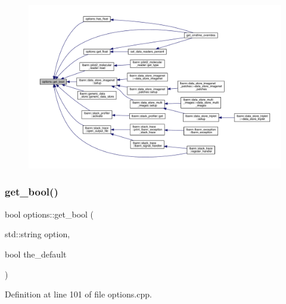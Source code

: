 \begin{figure}[H]
\begin{center}
\leavevmode
\includegraphics[width=350pt]{classoptions_a99aa190102de33e2aed39723929f9fad_icgraph}
\end{center}
\end{figure}
\mbox{\label{classoptions_a9ce5a1af62eeb42a88a1b47f5891e247}} 
\subsubsection{\texorpdfstring{get\+\_\+bool()}{get\_bool()}\hspace{0.1cm}{\footnotesize\ttfamily [2/2]}}
{\footnotesize\ttfamily bool options\+::get\+\_\+bool (\begin{DoxyParamCaption}\item[{std\+::string}]{option,  }\item[{bool}]{the\+\_\+default }\end{DoxyParamCaption})}



Definition at line 101 of file options.\+cpp.


